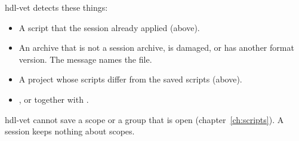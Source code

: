 hdl-vet detects these things:

\begin{itemize}
\item A script that the session already applied (above).
\item An archive that is not a session archive, is damaged, or has another format
  version. The message names the file.
\item A project whose scripts differ from the saved scripts (above).
\item {},  or  together with .
\end{itemize}

hdl-vet cannot save a scope or a group that is open (chapter~\ref{ch:scripts}). A session
keeps nothing about scopes.
